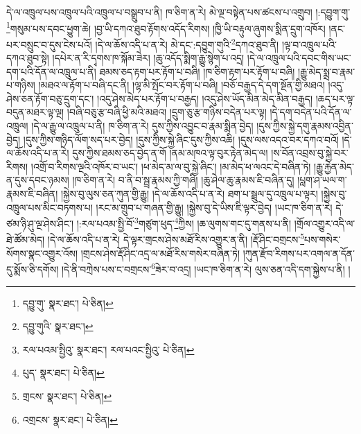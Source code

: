 དེ་ལ་འཁྲུལ་པས་འཁྲུལ་པའི་འཁྲུལ་པ་བསྒྲུབ་པ་ནི། ཁ་ཅིག་ན་རེ། མེ་ལྔ་བསྟེན་པས་ཚངས་པ་འགྲུབ། །:དབྱུག་གུ་\footnote{དབྱུ་གུ་  སྣར་ཐང་།  པེ་ཅིན། }གསུམ་པས་དབང་ཕྱུག་ཆེ། །བྱ་ཡི་དཀའ་ཐུབ་རྟོགས་འདོད་རིགས། །ཁྱི་ཡི་བརྟུལ་ཞུགས་སྨིན་དྲུག་འཁོར། །ནང་པར་བསྲུང་བ་དུས་ངེས་པའོ། །དེ་ལ་ཆོས་འདི་པ་ན་རེ། མེ་དང་:དབྱུག་གུའི་\footnote{དབྱུ་གུའི་  སྣར་ཐང་། }དཀའ་ཐུབ་ནི། །ལྟ་བ་འཁྲུལ་པའི་དཀའ་ཐུབ་སྟེ། །དཔེར་ན་རི་དྭགས་ཁ་སྐོམ་ཟེར། །ཆུ་འདོད་སྨིག་རྒྱུ་སྙེག་པ་འདྲ། །དེ་ལ་འཁྲུལ་པའི་དབང་གིས་ཡང་དག་པའི་དོན་ལ་འཁྲུལ་པ་ནི། ཐམས་ཅད་རྟག་པར་རྟོག་པ་བཞི། །ཁ་ཅིག་རྟག་པར་རྟོག་པ་བཞི། །རྒྱུ་མེད་སྨྲ་བ་རྣམ་པ་གཉིས། །མཐའ་ལ་རྟོག་པ་བཞི་དང་ནི། །ལྷ་མི་སྤོང་བར་རྟོག་པ་བཞི། །བཅོ་བརྒྱད་དེ་དག་སྔོན་གྱི་མཐའ། །འདུ་ཤེས་ཅན་རྟོག་བཅུ་དྲུག་དང་། །འདུ་ཤེས་མེད་པར་རྟོག་པ་བརྒྱད། །འདུ་ཤེས་ཡོད་མིན་མེད་མིན་བརྒྱད། །ཆད་པར་ལྟ་བདུན་མཐར་ལྟ་ལྔ། །བཞི་བཅུ་རྩ་བཞི་ཕྱི་མའི་མཐའ། །དྲུག་ཅུ་རྩ་གཉིས་བདེན་པར་ལྟ། །དེ་དག་བདེན་པའི་དོན་ལ་འཁྲུལ། །དེ་ལ་རྒྱུ་ལ་འཁྲུལ་པ་ནི། ཁ་ཅིག་ན་རེ། དུས་ཀྱིས་འབྱུང་བ་རྣམ་སྨིན་བྱེད། །དུས་ཀྱིས་སྐྱེ་དགུ་རྣམས་འབྱིན་བྱེད། །དུས་ཀྱིས་གཉིད་ལོག་སད་པར་བྱེད། །དུས་ཀྱིས་སྐྱེ་ཞིང་དུས་ཀྱིས་འཆི། །དུས་ལས་འདའ་བར་དཀའ་བའོ། །དེ་ལ་ཆོས་འདི་པ་ན་རེ། དུས་ཀྱིས་ཐམས་ཅད་བྱེད་ན་གོ །ནམ་མཁའ་ལྟ་བུར་རྟེན་མེད་ལ། །ས་བོན་འབྲས་བུ་སྐྱེ་བར་རིགས། །འགྲོ་བ་རིགས་ལྔའི་འཁོར་བ་ཡང་། །ཕ་མེད་མ་ལ་བུ་སྐྱེ་ཞིང་། །མ་མེད་ཕ་ལའང་དེ་བཞིན་ཏེ། །རྒྱུ་རྐྱེན་མེད་ན་དུས་དབང་ཉམས། །ཁ་ཅིག་ན་རེ། བ་ནི་བ་སྦྲ་རྣམས་ཀྱི་གཞི། །ཆུ་ཤེལ་ཆུ་རྣམས་ཇི་བཞིན་དུ། །པླག་ཤ་ཡལ་ག་རྣམས་ཇི་བཞིན། །སྐྱེས་བུ་ལུས་ཅན་ཀུན་གྱི་རྒྱུ། །དེ་ལ་ཆོས་འདི་པ་ན་རེ། ཐག་པ་སྦྲུལ་དུ་འཁྲུལ་པ་ལྟར། །སྐྱེས་བུ་འཁྲུལ་པས་མིང་བཏགས་པ། །རང་མ་གྲུབ་པ་གཞན་གྱི་རྒྱུ། །སྐྱེས་བུ་དེ་ཡིས་ཇི་ལྟར་བྱེད། །ཡང་ཁ་ཅིག་ན་རེ། དེ་ཙམ་ཉི་ཤུ་ལྔ་ཤེས་ཤིང་། །:རལ་པའམ་སྤྱི་བོ་\footnote{རལ་པའམ་སྤྱིའུ་  སྣར་ཐང་། རལ་པའང་སྤྱིའུ་  པེ་ཅིན། }གཙུག་ཕུད་\footnote{པུད་  སྣར་ཐང་།  པེ་ཅིན། }ཀྱིས། །ཆ་ལུགས་གང་དུ་གནས་པ་ནི། །གྲོལ་འགྱུར་འདི་ལ་ཐེ་ཚོམ་མེད། །དེ་ལ་ཆོས་འདི་པ་ན་རེ། དེ་ལྟར་གྲངས་ཤེས་མཐོ་རིས་འགྱུར་ན་ནི། །རྡོ་ཤིང་བགྲངས་\footnote{གྲངས་  སྣར་ཐང་།  པེ་ཅིན། }པས་གསེར་སོགས་སྣང་འགྱུར་འོས། །གྲངས་ཤེས་རྡོ་ཤིང་འདྲ་ལ་མཐོ་རིས་གསེར་བཞིན་ཏེ། །ཀུན་རྫོབ་རིགས་པར་འགལ་ན་དོན་དུ་སྨོས་ཅི་དགོས། །དེ་ནི་བཀྲེས་པས་ང་བགྲངས་\footnote{འགྲངས་  སྣར་ཐང་།  པེ་ཅིན། }ཟེར་བ་འདྲ། །ཡང་ཁ་ཅིག་ན་རེ། ལུས་ཅན་འདི་དག་སྐྱེས་པ་ནི། །
